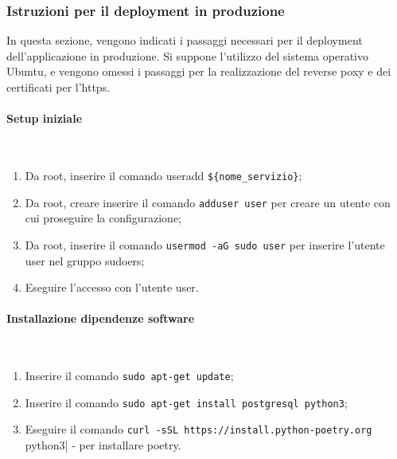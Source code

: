 \documentclass[11pt]{article} %
\begin{document}
\subsubsection{Istruzioni per il deployment in produzione}

In questa sezione, vengono indicati i passaggi necessari per il deployment dell'applicazione in produzione. Si suppone l'utilizzo del sistema operativo Ubuntu, e vengono omessi i passaggi per la realizzazione del reverse poxy e dei certificati per l'https.

\paragraph{Setup iniziale}\mbox{}\\

\begin{enumerate}
\item Da root, inserire il comando useradd \verb|${nome_servizio}|;
\item Da root, creare inserire il comando \verb|adduser user| per creare un utente con cui proseguire la configurazione;
\item Da root, inserire il comando \verb|usermod -aG sudo user| per inserire l'utente user nel gruppo sudoers;
\item Eseguire l'accesso con l'utente user.
\end{enumerate}

\paragraph{Installazione dipendenze software}\mbox{}\\
\begin{enumerate}
\item Inserire il comando \verb|sudo apt-get update|;
\item Inserire il comando \verb|sudo apt-get install postgresql python3|;
\item Eseguire il comando \verb|curl -sSL https://install.python-poetry.org | python3| - per installare poetry.
\end{enumerate}
\end{document}
